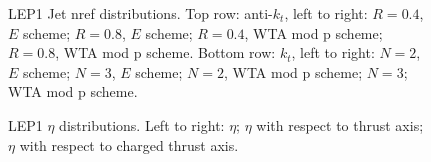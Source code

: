 \begin{figure}[H]
\hfill
{}\hfill
{}\hfill
\caption{LEP1 Jet nref distributions. Top row: anti-$k_t$, left to right: $R=0.4$, $E$ scheme; $R=0.8$, $E$ scheme; $R=0.4$, WTA mod p scheme; $R=0.8$, WTA mod p scheme. Bottom row: $k_t$, left to right: $N=2$, $E$ scheme; $N=3$, $E$ scheme; $N=2$, WTA mod p scheme; $N=3$; WTA mod p scheme.}  
\end{figure}

\begin{figure}[H]
\centering
{}\hfill
{}\hfill
{}\hfill
\caption{LEP1 $\eta$ distributions. Left to right: $\eta$; $\eta$ with respect to thrust axis; $\eta$ with respect to charged thrust axis.}
\end{figure}

